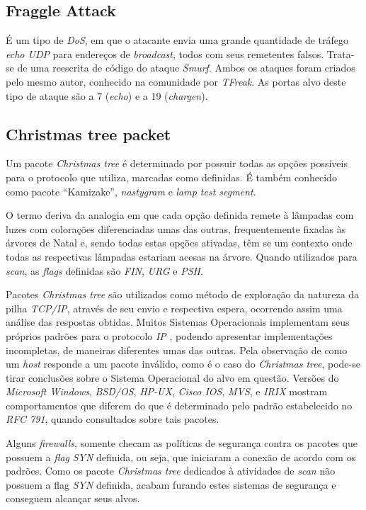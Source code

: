 \subsection{Fraggle Attack}

É um tipo de \textit{DoS}, em que o atacante envia uma grande quantidade de tráfego \textit{echo UDP} para endereços de \textit{broadcast}, todos com seus remetentes falsos. Trata-se de uma reescrita de código do ataque \textit{Smurf}. Ambos os ataques foram criados pelo mesmo autor, conhecido na comunidade por \textit{TFreak}. As portas alvo deste tipo de ataque são a 7 (\textit{echo}) e a 19 (\textit{chargen}).


\subsection{Christmas tree packet}

Um pacote \textit{Christmas tree} é determinado por possuir todas as opções possíveis para o protocolo que utiliza, marcadas como definidas. É também conhecido como pacote ``Kamizake'', \textit{nastygram} e \textit{lamp test segment}.

O termo deriva da analogia em que cada opção definida remete à lâmpadas com luzes com colorações diferenciadas umas das outras, frequentemente fixadas às árvores de Natal e, sendo todas estas opções ativadas, têm se um contexto onde todas as respectivas lâmpadas estariam acesas na árvore. Quando utilizados para \textit{scan}, as \textit{flags} definidas são \textit{FIN}, \textit{URG} e \textit{PSH}.

Pacotes \textit{Christmas tree} são utilizados como método de exploração da natureza da pilha \textit{TCP/IP}, através de seu envio e respectiva espera, ocorrendo assim uma análise das respostas obtidas. Muitos Sistemas Operacionais implementam seus próprios padrões para o protocolo \textit{IP} \cite{RFC791}, podendo apresentar implementações incompletas, de maneiras diferentes umas das outras. Pela observação de como um \textit{host} responde a um pacote inválido, como é o caso do \textit{Christmas tree}, pode-se tirar conclusões sobre o Sistema Operacional do alvo em questão. Versões do \textit{Microsoft Windows}, \textit{BSD/OS}, \textit{HP-UX}, \textit{Cisco IOS}, \textit{MVS}, e \textit{IRIX} mostram comportamentos que diferem do que é determinado pelo padrão estabelecido no \textit{RFC 791}, quando consultados sobre tais pacotes.

Alguns \textit{firewalls}, somente checam as políticas de segurança contra os pacotes que possuem a \textit{flag} \textit{SYN} definida, ou seja, que iniciaram a conexão de acordo com os padrões. Como os pacote \textit{Christmas tree} dedicados à atividades de \textit{scan} não possuem a flag \textit{SYN} definida, acabam furando estes sistemas de segurança e conseguem alcançar seus alvos.

